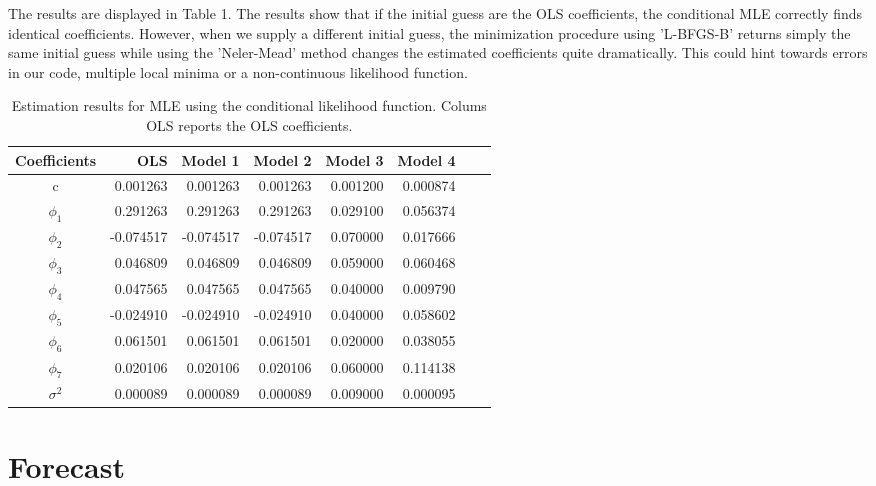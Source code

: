 \documentclass{article}
\begin{document}
The results are displayed in Table 1.
The results show that if the initial guess are the OLS coefficients, the conditional MLE correctly finds identical coefficients. However, when we supply a different initial guess, the minimization procedure using 'L-BFGS-B' returns simply the same initial guess while using the 'Neler-Mead' method changes the estimated coefficients quite dramatically.
This could hint towards errors in our code, multiple local minima or a non-continuous likelihood function.

\begin{table}[ht]

\begin{tabular}{lrrrrrrr|}
\hline
\multicolumn{1}{|c}{Coefficients} & OLS & \multicolumn{1}{c}{Model 1} & \multicolumn{1}{c}{Model 2} & \multicolumn{1}{c}{Model 3} & \multicolumn{1}{l|}{Model 4} \\ \hline
\multicolumn{1}{|c|}{c}    & 0.001263 & 0.001263 & 0.001263 & 0.001200 & 0.000874 \\
\multicolumn{1}{|c|}{$\phi_1$} & 0.291263 & 0.291263 & 0.291263 & 0.029100 & 0.056374 \\
\multicolumn{1}{|c|}{$\phi_2$} & -0.074517 & -0.074517 & -0.074517 & 0.070000 & 0.017666 \\
\multicolumn{1}{|c|}{$\phi_3$} & 0.046809 & 0.046809 & 0.046809 & 0.059000 & 0.060468 \\
\multicolumn{1}{|c|}{$\phi_4$} & 0.047565 & 0.047565 & 0.047565 & 0.040000 & 0.009790 \\
\multicolumn{1}{|c|}{$\phi_5$}& -0.024910 & -0.024910 & -0.024910 & 0.040000 & 0.058602 \\
\multicolumn{1}{|c|}{$\phi_6$} & 0.061501 & 0.061501 & 0.061501 & 0.020000 & 0.038055 \\
\multicolumn{1}{|c|}{$\phi_7$} & 0.020106 & 0.020106 & 0.020106 & 0.060000 & 0.114138 \\
\multicolumn{1}{|c|}{$\sigma^2$} & 0.000089 & 0.000089 & 0.000089 & 0.009000 & 0.000095 \\
\hline
\end{tabular}
\caption{Estimation results for MLE using the conditional likelihood function. Colums OLS reports the OLS coefficients.}
\end{table}

\section{Forecast}
\end{document}
